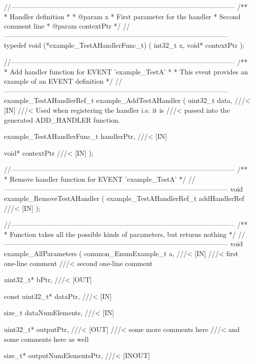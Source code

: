 \begin{DoxyVerbInclude}
//--------------------------------------------------------------------------------------------------
/**
 * Handler definition
 *
 * @param x
 *        First parameter for the handler
 *        Second comment line
 * @param contextPtr
 */
//--------------------------------------------------------------------------------------------------
typedef void (*example_TestAHandlerFunc_t)
(
    int32_t x,
    void* contextPtr
);

//--------------------------------------------------------------------------------------------------
/**
 * Add handler function for EVENT 'example_TestA'
 *
 * This event provides an example of an EVENT definition
 */
//--------------------------------------------------------------------------------------------------
example_TestAHandlerRef_t example_AddTestAHandler
(
    uint32_t data,
        ///< [IN]
        ///< Used when registering the handler i.e. it is
        ///< passed into the generated ADD_HANDLER function.

    example_TestAHandlerFunc_t handlerPtr,
        ///< [IN]

    void* contextPtr
        ///< [IN]
);

//--------------------------------------------------------------------------------------------------
/**
 * Remove handler function for EVENT 'example_TestA'
 */
//--------------------------------------------------------------------------------------------------
void example_RemoveTestAHandler
(
    example_TestAHandlerRef_t addHandlerRef
        ///< [IN]
);

//--------------------------------------------------------------------------------------------------
/**
 * Function takes all the possible kinds of parameters, but returns nothing
 */
//--------------------------------------------------------------------------------------------------
void example_AllParameters
(
    common_EnumExample_t a,
        ///< [IN]
        ///< first one-line comment
        ///< second one-line comment

    uint32_t* bPtr,
        ///< [OUT]

    const uint32_t* dataPtr,
        ///< [IN]

    size_t dataNumElements,
        ///< [IN]

    uint32_t* outputPtr,
        ///< [OUT]
        ///< some more comments here
        ///< and some comments here as well

    size_t* outputNumElementsPtr,
        ///< [INOUT]


\end{DoxyVerbInclude}
